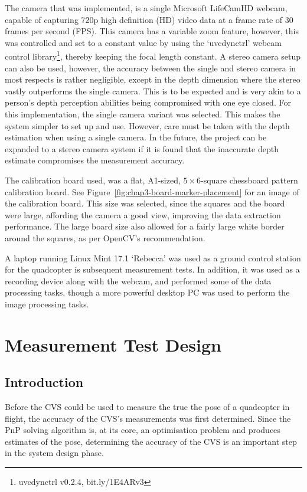 The camera that was implemented, is a single Microsoft LifeCamHD webcam, capable of capturing 720p high definition (HD) video data at a frame rate of 30 frames per second (FPS). This camera has a variable zoom feature, however, this was controlled and set to a constant value by using the `uvcdynctrl' webcam control library\footnote{uvcdynctrl v0.2.4, bit.ly/1E4ARv3}, thereby keeping the focal length constant. A stereo camera setup can also be used, however, the accuracy between the single and stereo camera in most respects is rather negligible, except in the depth dimension where the stereo vastly outperforms the single camera. This is to be expected and is very akin to a person's depth perception abilities being compromised with one eye closed. For this implementation, the single camera variant was selected. This makes the system simpler to set up and use. However, care must be taken with the depth estimation when using a single camera. In the future, the project can be expanded to a stereo camera system if it is found that the inaccurate depth estimate compromises the measurement accuracy.

The calibration board used, was a flat, A1-sized, $5\times6$-square chessboard pattern calibration board. See Figure~\ref{fig:chap3-board-marker-placement} for an image of the calibration board. This size was selected, since the squares and the board were large, affording the camera a good view, improving the data extraction performance. The large board size also allowed for a fairly large white border around the squares, as per OpenCV's recommendation. 

A laptop running Linux Mint 17.1 `Rebecca' was used as a ground control station for the quadcopter is subsequent measurement tests. In addition, it was used as a recording device along with the webcam, and performed some of the data processing tasks, though a more powerful desktop PC was used to perform the image processing tasks. 

\section{Measurement Test Design}

\subsection{Introduction}

Before the CVS could be used to measure the true the pose of a quadcopter in flight, the accuracy of the CVS's measurements was first determined. Since the PnP solving algorithm is, at its core, an optimisation problem and produces estimates of the pose, determining the accuracy of the CVS is an important step in the system design phase. 

